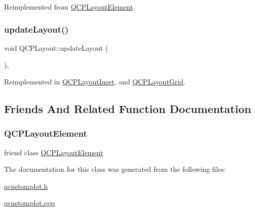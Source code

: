 Reimplemented from \hyperlink{class_q_c_p_layout_element_a929c2ec62e0e0e1d8418eaa802e2af9b}{Q\+C\+P\+Layout\+Element}.

\mbox{\label{class_q_c_p_layout_a165c77f6287ac92e8d03017ad913378b}} 
\subsubsection{\texorpdfstring{update\+Layout()}{updateLayout()}}
{\footnotesize\ttfamily void Q\+C\+P\+Layout\+::update\+Layout (\begin{DoxyParamCaption}{ }\end{DoxyParamCaption})\hspace{0.3cm}{\ttfamily [protected]}, {\ttfamily [virtual]}}



Reimplemented in \hyperlink{class_q_c_p_layout_inset_a493526b922ea66a75c45ef1842446988}{Q\+C\+P\+Layout\+Inset}, and \hyperlink{class_q_c_p_layout_grid_a6cf43f14d3fa335fd8758561ccf1f78c}{Q\+C\+P\+Layout\+Grid}.



\subsection{Friends And Related Function Documentation}
\mbox{\label{class_q_c_p_layout_a0790750c7e7f14fdbd960d172655b42b}} 
\subsubsection{\texorpdfstring{Q\+C\+P\+Layout\+Element}{QCPLayoutElement}}
{\footnotesize\ttfamily friend class \hyperlink{class_q_c_p_layout_element}{Q\+C\+P\+Layout\+Element}\hspace{0.3cm}{\ttfamily [friend]}}



The documentation for this class was generated from the following files\+:\begin{DoxyCompactItemize}
\item 
\hyperlink{qcustomplot_8h}{qcustomplot.\+h}\item 
\hyperlink{qcustomplot_8cpp}{qcustomplot.\+cpp}\end{DoxyCompactItemize}

